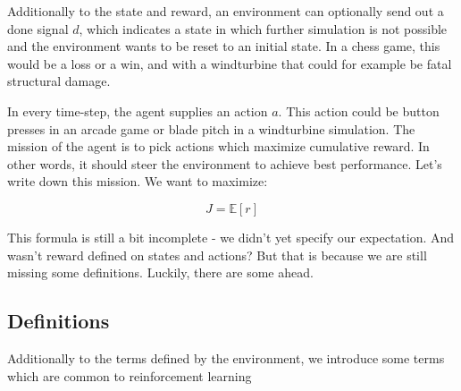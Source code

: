 \documentclass[hyperref,final,beleg]{cgvpub}
\begin{document}
Additionally to the state and reward, an environment can optionally send out a done signal \(d\), which indicates a state in which further simulation is not possible and the environment wants to be reset to an initial state. In a chess game, this would be a loss or a win, and with a windturbine that could for example be fatal structural damage. 

In every time-step, the agent supplies an action \(a\). This action could be button presses in an arcade game or blade pitch in a windturbine simulation. The mission of the agent is to pick actions which maximize cumulative reward. In other words, it should steer the environment to achieve best performance. Let's write down this mission. We want to maximize:

\begin{equation}
J = \mathbb{E}[r]
\end{equation}

This formula is still a bit incomplete - we didn't yet specify our expectation. And wasn't reward defined on states and actions? But that is because we are still missing some definitions. Luckily, there are some ahead.

\subsection{Definitions}
\label{sec:definitions}

Additionally to the terms defined by the environment, we introduce some terms which are common to reinforcement learning
\end{document}
